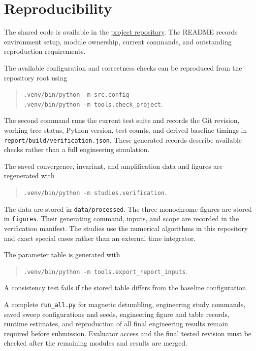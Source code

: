 \section{Reproducibility}
The shared code is available in the \href{https://github.com/Yuvraj-Agarwal-101/CubeSat-Detumbling-with-Magnetorquers}{project repository}. The README records environment setup, module ownership, current commands, and outstanding reproduction requirements.

The available configuration and correctness checks can be reproduced from the repository root using
\begin{quote}
\texttt{.venv/bin/python \string-m src.config}\\
\texttt{.venv/bin/python \string-m tools.check\_project}.
\end{quote}
The second command runs the current test suite and records the Git revision, working tree status, Python version, test counts, and derived baseline timings in \texttt{report/build/verification.json}. These generated records describe available checks rather than a full engineering simulation.

The saved convergence, invariant, and amplification data and figures are regenerated with
\begin{quote}
\texttt{.venv/bin/python \string-m studies.verification}.
\end{quote}
The data are stored in \texttt{data/processed}. The three monochrome figures are stored in \texttt{figures}. Their generating command, inputs, and scope are recorded in the verification manifest. The studies use the numerical algorithms in this repository and exact special cases rather than an external time integrator.


The parameter table is generated with
\begin{quote}
\texttt{.venv/bin/python \string-m tools.export\_report\_inputs}.
\end{quote}
A consistency test fails if the stored table differs from the baseline configuration.

A complete \texttt{run\_all.py} for magnetic detumbling, engineering study commands, saved sweep configurations and seeds, engineering figure and table records, runtime estimates, and reproduction of all final engineering results remain required before submission. Evaluator access and the final tested revision must be checked after the remaining modules and results are merged.
